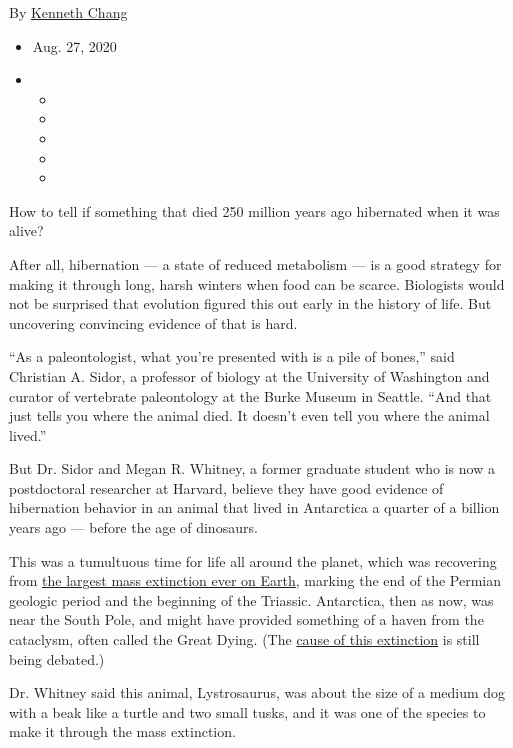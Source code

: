 By \href{https://www.nytimes3xbfgragh.onion/by/kenneth-chang}{Kenneth
Chang}

\begin{itemize}
\item
  Aug. 27, 2020
\item
  \begin{itemize}
  \item
  \item
  \item
  \item
  \item
  \end{itemize}
\end{itemize}

How to tell if something that died 250 million years ago hibernated when
it was alive?

After all, hibernation --- a state of reduced metabolism --- is a good
strategy for making it through long, harsh winters when food can be
scarce. Biologists would not be surprised that evolution figured this
out early in the history of life. But uncovering convincing evidence of
that is hard.

``As a paleontologist, what you're presented with is a pile of bones,''
said Christian A. Sidor, a professor of biology at the University of
Washington and curator of vertebrate paleontology at the Burke Museum in
Seattle. ``And that just tells you where the animal died. It doesn't
even tell you where the animal lived.''

But Dr. Sidor and Megan R. Whitney, a former graduate student who is now
a postdoctoral researcher at Harvard, believe they have good evidence of
hibernation behavior in an animal that lived in Antarctica a quarter of
a billion years ago --- before the age of dinosaurs.

This was a tumultuous time for life all around the planet, which was
recovering from
\href{https://www.nytimes3xbfgragh.onion/2018/12/07/science/climate-change-mass-extinction.html}{the
largest mass extinction ever on Earth}, marking the end of the Permian
geologic period and the beginning of the Triassic. Antarctica, then as
now, was near the South Pole, and might have provided something of a
haven from the cataclysm, often called the Great Dying. (The
\href{https://www.nytimes3xbfgragh.onion/2014/02/21/science/earth/Mass-Extinction-Permian-Period.html}{cause
of this extinction} is still being debated.)

Dr. Whitney said this animal, Lystrosaurus, was about the size of a
medium dog with a beak like a turtle and two small tusks, and it was one
of the species to make it through the mass extinction.

